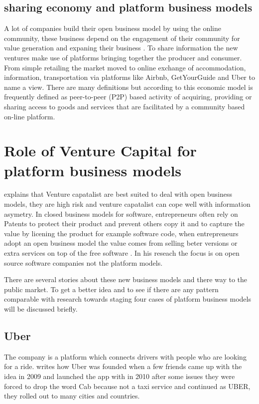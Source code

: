 \documentclass[a4paper, 11pt]{article}
\begin{document}
\subsection{sharing economy and platform business models}
A lot of companies build their open business model by using the online community, these business depend on the engagement of their community for value generation and expaning their business \citep{colombo2016open}. To share information the new ventures make use of platforms bringing together the producer and consumer. From simple retailing the market moved to online exchange of accommodation, information, transportation via platforms like Airbnb, GetYourGuide and Uber to name a view. There are many definitions but according to \cite{investopia} this economic model is frequently defined as peer-to-peer (P2P) based activity of acquiring, providing or sharing access to goods and services that are facilitated by a community based on-line platform.



\section{Role of Venture Capital for platform business models}

\cite{colombo2016open} explains that Venture capatalist are best suited to deal with open business models, they are high risk and venture capatalist can cope well with information asymetry. In closed business models for software, entrepreneurs often rely on Patents to protect their product and prevent others copy it and to capture the value by licening the product for example software code, when entrepreneurs adopt an open business model the value comes from selling beter versions or extra services on top of the free software \citep{colombo2016open}. In his reseach the focus is on open source software companies not the platform models.   


There are several stories about these new business models and there way to the public market. To get a better idea and to see if there are any pattern comparable with \cite{colombo2016open} research towards staging four cases of platform business models will be discussed briefly.


\subsection{Uber} 

The company is a platform which connects drivers with people who are looking for a ride. \cite{griswold} writes how Uber was founded when a few friends came up with the idea in 2009 and launched the app with in 2010 after some issues they were forced to drop the word Cab because not a taxi service and continued as UBER, they rolled out to many cities and countries.
\end{document}
